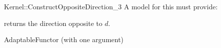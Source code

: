 \begin{ccRefFunctionObjectConcept}{Kernel::ConstructOppositeDirection_3}
A model for this must provide:


 {returns the direction opposite to $d$.}

\ccRefines
AdaptableFunctor (with one argument)

\ccSeeAlso
{} \\

\end{ccRefFunctionObjectConcept}
